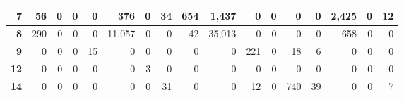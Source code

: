 \begin{table}[H]
\begin{tabular}{rrrrrrrrrrrrrrrrr}
\multicolumn{1}{|r|}{\textbf{7}}     & \multicolumn{1}{r|}{56}         & \multicolumn{1}{r|}{0}          & \multicolumn{1}{r|}{0}          & \multicolumn{1}{r|}{0}          & \multicolumn{1}{r|}{376}        & \multicolumn{1}{r|}{0}          & \multicolumn{1}{r|}{34}         & \multicolumn{1}{r|}{654}        & \multicolumn{1}{r|}{1,437}       & \multicolumn{1}{r|}{0}          & \multicolumn{1}{r|}{0}           & \multicolumn{1}{r|}{0}           & \multicolumn{1}{r|}{0}           & \multicolumn{1}{r|}{2,425}        & \multicolumn{1}{r|}{0}           & \multicolumn{1}{r|}{12}          \\ \hline
\multicolumn{1}{|r|}{\textbf{8}}     & \multicolumn{1}{r|}{290}        & \multicolumn{1}{r|}{0}          & \multicolumn{1}{r|}{0}          & \multicolumn{1}{r|}{0}          & \multicolumn{1}{r|}{11,057}      & \multicolumn{1}{r|}{0}          & \multicolumn{1}{r|}{0}          & \multicolumn{1}{r|}{42}         & \multicolumn{1}{r|}{35,013}      & \multicolumn{1}{r|}{0}          & \multicolumn{1}{r|}{0}           & \multicolumn{1}{r|}{0}           & \multicolumn{1}{r|}{0}           & \multicolumn{1}{r|}{658}         & \multicolumn{1}{r|}{0}           & \multicolumn{1}{r|}{0}           \\ \hline
\multicolumn{1}{|r|}{\textbf{9}}     & \multicolumn{1}{r|}{0}          & \multicolumn{1}{r|}{0}          & \multicolumn{1}{r|}{0}          & \multicolumn{1}{r|}{15}         & \multicolumn{1}{r|}{0}          & \multicolumn{1}{r|}{0}          & \multicolumn{1}{r|}{0}          & \multicolumn{1}{r|}{0}          & \multicolumn{1}{r|}{0}          & \multicolumn{1}{r|}{221}        & \multicolumn{1}{r|}{0}           & \multicolumn{1}{r|}{18}          & \multicolumn{1}{r|}{6}           & \multicolumn{1}{r|}{0}           & \multicolumn{1}{r|}{0}           & \multicolumn{1}{r|}{0}           \\ \hline
\multicolumn{1}{|r|}{\textbf{12}}    & \multicolumn{1}{r|}{0}          & \multicolumn{1}{r|}{0}          & \multicolumn{1}{r|}{0}          & \multicolumn{1}{r|}{0}          & \multicolumn{1}{r|}{0}          & \multicolumn{1}{r|}{3}          & \multicolumn{1}{r|}{0}          & \multicolumn{1}{r|}{0}          & \multicolumn{1}{r|}{0}          & \multicolumn{1}{r|}{0}          & \multicolumn{1}{r|}{0}           & \multicolumn{1}{r|}{0}           & \multicolumn{1}{r|}{0}           & \multicolumn{1}{r|}{0}           & \multicolumn{1}{r|}{0}           & \multicolumn{1}{r|}{0}           \\ \hline
\multicolumn{1}{|r|}{\textbf{14}}    & \multicolumn{1}{r|}{0}          & \multicolumn{1}{r|}{0}          & \multicolumn{1}{r|}{0}          & \multicolumn{1}{r|}{0}          & \multicolumn{1}{r|}{0}          & \multicolumn{1}{r|}{0}          & \multicolumn{1}{r|}{31}         & \multicolumn{1}{r|}{0}          & \multicolumn{1}{r|}{0}          & \multicolumn{1}{r|}{12}         & \multicolumn{1}{r|}{0}           & \multicolumn{1}{r|}{740}         & \multicolumn{1}{r|}{39}          & \multicolumn{1}{r|}{0}           & \multicolumn{1}{r|}{0}           & \multicolumn{1}{r|}{7}           \\ \hline

\end{tabular}
\end{table}
